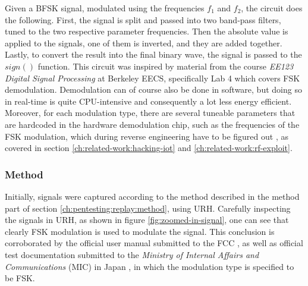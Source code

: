 Given a BFSK signal, modulated using the frequencies $f_1$ and $f_2$, the circuit does the following. First, the signal is split and passed into two band-pass filters, tuned to the two respective parameter frequencies. Then the absolute value is applied to the signals, one of them is inverted, and they are added together. Lastly, to convert the result into the final binary wave, the signal is passed to the $sign()$ function. This circuit was inspired by material from the course \textit{EE123 Digital Signal Processing} at Berkeley EECS, specifically Lab 4 which covers FSK demodulation. Demodulation can of course also be done in software, but doing so in real-time is quite CPU-intensive and consequently a lot less energy efficient. Moreover, for each modulation type, there are several tuneable parameters that are hardcoded in the hardware demodulation chip, such as the frequencies of the FSK modulation, which during reverse engineering have to be figured out \cite{hacking-the-iot-talk, rf-exploitation-talk}, as covered in section \ref{ch:related-work:hacking-iot} and \ref{ch:related-work:rf-exploit}.

\subsubsection{Method}
Initially, signals were captured according to the method described in the method part of section \ref{ch:pentesting:replay:method}, using \gls{URH}. Carefully inspecting the signals in URH, as shown in figure \ref{fig:zoomed-in-signal}, one can see that clearly \gls{FSK} modulation is used to modulate the signal. This conclusion is corroborated by the official user manual submitted to the FCC \cite{hsgw-user-manual}, as well as official test documentation submitted to the \textit{Ministry of Internal Affairs and Communications} (MIC) in Japan \cite{mic-test-report}, in which the modulation type is specified to be FSK.

